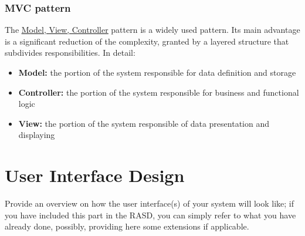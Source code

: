 \documentclass{article}
\newcommand{\link}[2]{{\color{blue}\underline{\href{#1}{#2}}}}
\begin{document}
		\subsubsection{MVC pattern}
			The \link{https://en.wikipedia.org/wiki/Model-view-controller}{Model, View, Controller} pattern is a widely 
			used pattern. Its main advantage is a significant reduction of the complexity, granted by a layered
			structure that subdivides responsibilities. In detail:
			\begin{itemize}
				\item \textbf{Model:} the portion of the  system responsible for data definition and storage
				\item \textbf{Controller:} the portion of the system responsible for business and functional logic
				\item \textbf{View:} the portion of the system responsible of data presentation and displaying
			\end{itemize}
\newpage
\section{User Interface Design}Provide	an	overview	on	how	the	user	interface(s)	of	your	system	will	
look	like; if	you	 have	included	 this	 part	in	 the	 RASD,	you	 can	 simply	 refer	 to	what	you	 have	
already	done,	possibly,	providing	here	some	extensions	if	applicable.
	\FloatBarrier
\end{document}
